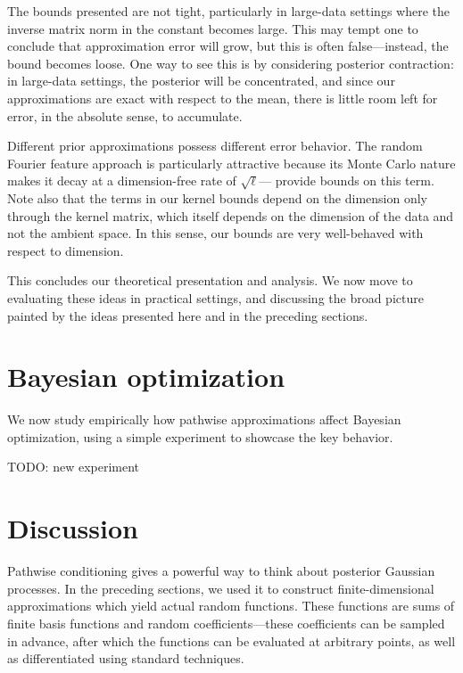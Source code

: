 \documentclass[11pt]{book}
\begin{document}
The bounds presented are not tight, particularly in large-data settings where the inverse matrix norm in the constant becomes large.
This may tempt one to conclude that approximation error will grow, but this is often false---instead, the bound becomes loose.
One way to see this is by considering posterior contraction: in large-data settings, the posterior will be concentrated, and since our approximations are exact with respect to the mean, there is little room left for error, in the absolute sense, to accumulate.

Different prior approximations possess different error behavior.
The random Fourier feature approach is particularly attractive because its Monte Carlo nature makes it decay at a dimension-free rate of $\sqrt{\ell}$---\textcite{sutherland15} provide bounds on this term.
Note also that the terms in our kernel bounds depend on the dimension only through the kernel matrix, which itself depends on the dimension of the data and not the ambient space.
In this sense, our bounds are very well-behaved with respect to dimension.

This concludes our theoretical presentation and analysis.
We now move to evaluating these ideas in practical settings, and discussing the broad picture painted by the ideas presented here and in the preceding sections.

\section{Bayesian optimization}

We now study empirically how pathwise approximations affect Bayesian optimization, using a simple experiment to showcase the key behavior.

TODO: new experiment

\section{Discussion}

Pathwise conditioning gives a powerful way to think about posterior Gaussian processes.
In the preceding sections, we used it to construct finite-dimensional approximations which yield actual random functions.
These functions are sums of finite basis functions and random coefficients---these coefficients can be sampled in advance, after which the functions can be evaluated at arbitrary points, as well as differentiated using standard techniques.
\end{document}
